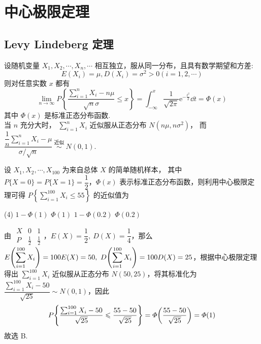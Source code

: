 \section{中心极限定理}

\subsection{Levy Lindeberg 定理}

\begin{theorem}
    设随机变量 $ X_{1}, X_{2}, \cdots, X_{n}, \cdots $ 相互独立，服从同一分布，且具有数学期望和方差:
    $$E\left(X_{i}\right)=\mu, D\left(X_{i}\right)=\sigma^{2}>0(i=1,2, \cdots)$$
    则对任意实数 $ x $ 都有
    $$\lim _{n \rightarrow \infty} P\left\{\frac{\sum_{i=1}^{n} X_{i}-n \mu}{\sqrt{n} \sigma} \leqslant x\right\}=\int_{-\infty}^{x} \frac{1}{\sqrt{2 \pi}} \mathrm{e}^{-\frac{t^{2}}{2}}\dd t=\varPhi(x)$$
    其中 $ \varPhi(x) $ 是标准正态分布函数.\\
    当 $ n $ 充分大时，
    $\displaystyle \sum_{i=1}^{n} X_{i} \text { 近似服从正态分布 } N\left(n \mu, n \sigma^{2}\right) $，
    而 $\dfrac{\displaystyle \dfrac{1}{n}\sum_{i=1}^{n} X_{i}-\mu}{\sigma / \sqrt{n}} \stackrel{\text { 近似 }}{\sim} N(0,1) .$
\end{theorem}

\begin{example}[2022 数一]
    设 $ X_{1}, X_{2}, \cdots, X_{100} $ 为来自总体 $ X $ 的简单随机样本，
    其中 $ P\{X=0\}=P\{X=1\}=\dfrac{1}{2}$，$\varPhi(x) $ 表示标准正态分布函数，则利用中心极限定理可得 $ \displaystyle P\left\{\sum_{i=1}^{100} X_{i} \leqslant 55\right\} $ 的近似值为 
    \begin{tasks}(4)
        \task $1-\varPhi(1)$
        \task $\varPhi(1)$
        \task $1-\varPhi(0.2)$
        \task $\varPhi(0.2)$
    \end{tasks}
\end{example}
\begin{solution}
    由 $\begin{array}{c|cc}
        X & 0           & 1           \\\hline
        P & \frac{1}{2} & \frac{1}{2}
    \end{array}$，$E(X)=\dfrac{1}{2},~D(X)=\dfrac{1}{4}$，那么 $\displaystyle E\qty(\sum_{i=1}^{100}X_i)=100E(X)=50,~D\qty(\sum_{i=1}^{100}X_i)=100 D(X)=25$，根据中心极限定理得出
    $\displaystyle\sum_{i=1}^{100}X_i$ 近似服从正态分布 $N(50,25)$，将其标准化为 $\dfrac{\displaystyle\sum_{i=1}^{100}X_i-50}{\sqrt{25}}\sim N(0,1)$，因此 
    $$P\qty{\dfrac{\sum_{i=1}^{100}X_i-50}{\sqrt{25}}\leqslant \dfrac{55-50}{\sqrt{25}}}=\varPhi\qty(\dfrac{55-50}{\sqrt{25}})=\varPhi(1)$$
    故选 B.
\end{solution}


